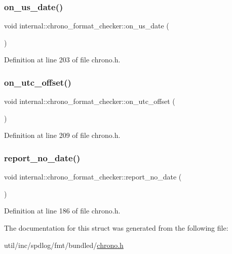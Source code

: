 \subsubsection{\texorpdfstring{on\+\_\+us\+\_\+date()}{on\_us\_date()}}
{\footnotesize\ttfamily void internal\+::chrono\+\_\+format\+\_\+checker\+::on\+\_\+us\+\_\+date (\begin{DoxyParamCaption}{ }\end{DoxyParamCaption})\hspace{0.3cm}{\ttfamily [inline]}}



Definition at line 203 of file chrono.\+h.

\mbox{\label{structinternal_1_1chrono__format__checker_a22152ec4562a1cd979db9d888e034aa1}} 
\subsubsection{\texorpdfstring{on\+\_\+utc\+\_\+offset()}{on\_utc\_offset()}}
{\footnotesize\ttfamily void internal\+::chrono\+\_\+format\+\_\+checker\+::on\+\_\+utc\+\_\+offset (\begin{DoxyParamCaption}{ }\end{DoxyParamCaption})\hspace{0.3cm}{\ttfamily [inline]}}



Definition at line 209 of file chrono.\+h.

\mbox{\label{structinternal_1_1chrono__format__checker_abdb2bdae8bb820a4cefec110e2d32cc4}} 
\subsubsection{\texorpdfstring{report\+\_\+no\+\_\+date()}{report\_no\_date()}}
{\footnotesize\ttfamily void internal\+::chrono\+\_\+format\+\_\+checker\+::report\+\_\+no\+\_\+date (\begin{DoxyParamCaption}{ }\end{DoxyParamCaption})\hspace{0.3cm}{\ttfamily [inline]}}



Definition at line 186 of file chrono.\+h.



The documentation for this struct was generated from the following file\+:\begin{DoxyCompactItemize}
\item 
util/inc/spdlog/fmt/bundled/\hyperlink{chrono_8h}{chrono.\+h}\end{DoxyCompactItemize}
